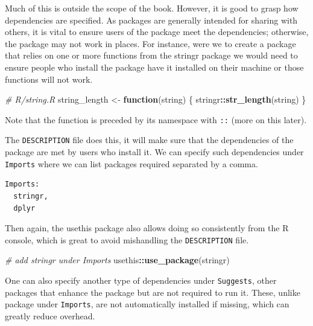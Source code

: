 \documentclass[
  10pt,
]{krantz}
\makeatletter
\newenvironment{Shaded}{\begin{snugshade}}{\end{snugshade}}
\newcommand{\CommentTok}[1]{\textcolor[rgb]{0.37,0.37,0.37}{\textit{#1}}}
\newcommand{\ControlFlowTok}[1]{\textcolor[rgb]{0.27,0.27,0.27}{\textbf{#1}}}
\newcommand{\KeywordTok}[1]{\textcolor[rgb]{0.27,0.27,0.27}{\textbf{#1}}}
\newcommand{\NormalTok}[1]{#1}
\newcommand{\OperatorTok}[1]{\textcolor[rgb]{0.43,0.43,0.43}{\textbf{#1}}}
\newcommand{\StringTok}[1]{\textcolor[rgb]{0.5,0.5,0.5}{#1}}
\newenvironment{kframe}{%
\medskip{}
\setlength{\fboxsep}{.8em}
 \def\at@end@of@kframe{}%
 \ifinner\ifhmode%
  \def\at@end@of@kframe{\end{minipage}}%
  \begin{minipage}{\columnwidth}%
 \fi\fi%
 \def\FrameCommand##1{\hskip\@totalleftmargin \hskip-\fboxsep
 \colorbox{shadecolor}{##1}\hskip-\fboxsep
     \hskip-\linewidth \hskip-\@totalleftmargin \hskip\columnwidth}%
 \MakeFramed {\advance\hsize-\width
   \@totalleftmargin\z@ \linewidth\hsize
   \@setminipage}}%
 {\par\unskip\endMakeFramed%
 \at@end@of@kframe}
\renewenvironment{Shaded}{\begin{kframe}}{\end{kframe}}
\newenvironment{rmdblock}[1]
  {
  \begin{itemize}
  \renewcommand{\labelitemi}{
    \raisebox{-.7\height}[0pt][0pt]{
      {\setkeys{Gin}{width=3em,keepaspectratio}\texttt{[image: images/\#1]}}
    }
  }
  \setlength{\fboxsep}{1em}
  \begin{kframe}
  \item
  }
  {
  \end{kframe}
  \end{itemize}
  }
\newenvironment{rmdnote}
  {\begin{rmdblock}{note}}
  {\end{rmdblock}}
\makeatother
\begin{document}
Much of this is outside the scope of the book. However, it is good to grasp how dependencies are specified. As packages are generally intended for sharing with others, it is vital to ensure users of the package meet the dependencies; otherwise, the package may not work in places. For instance, were we to create a package that relies on one or more functions from the stringr \citep{R-stringr} package we would need to ensure people who install the package have it installed on their machine or those functions will not work.

\begin{Shaded}
\begin{Highlighting}[]
\CommentTok{\# R/string.R}
\NormalTok{string\_length <{-}}\StringTok{ }\ControlFlowTok{function}\NormalTok{(string) \{}
\NormalTok{  stringr}\OperatorTok{::}\KeywordTok{str\_length}\NormalTok{(string)}
\NormalTok{\}}
\end{Highlighting}
\end{Shaded}

\begin{rmdnote}
Note that the function is preceded by its namespace with \texttt{::}
(more on this later).
\end{rmdnote}

The \texttt{DESCRIPTION} file does this, it will make sure that the dependencies of the package are met by users who install it. We can specify such dependencies under \texttt{Imports} where we can list packages required separated by a comma.

\begin{verbatim}
Imports:
  stringr,
  dplyr
\end{verbatim}

Then again, the usethis package also allows doing so consistently from the R console, which is great to avoid mishandling the \texttt{DESCRIPTION} file.

\begin{Shaded}
\begin{Highlighting}[]
\CommentTok{\# add stringr under Imports}
\NormalTok{usethis}\OperatorTok{::}\KeywordTok{use\_package}\NormalTok{(}\StringTok{\textquotesingle{}stringr\textquotesingle{}}\NormalTok{)}
\end{Highlighting}
\end{Shaded}

One can also specify another type of dependencies under \texttt{Suggests}, other packages that enhance the package but are not required to run it. These, unlike package under \texttt{Imports}, are not automatically installed if missing, which can greatly reduce overhead.
\end{document}
